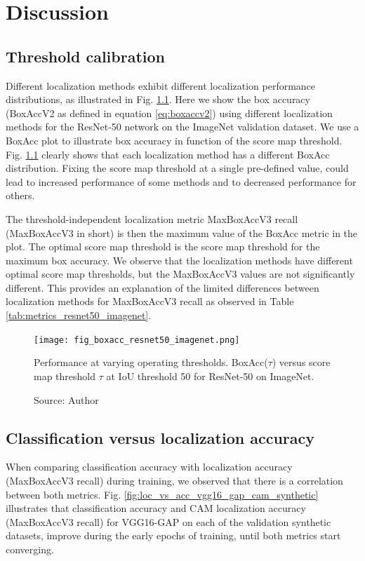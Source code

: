 \chapter{Discussion} \label{ch:discussion}

\section{Threshold calibration}
Different localization methods exhibit different localization performance distributions, as illustrated in Fig. \ref{fig:boxacc_resnet50_imagenet}. Here we show the box accuracy (BoxAccV2 as defined in equation \ref{eq:boxaccv2}) using different localization methods for the ResNet-50 network on the ImageNet validation dataset. We use a BoxAcc plot to illustrate box accuracy in function of the score map threshold. Fig. \ref{fig:boxacc_resnet50_imagenet} clearly shows that each localization method has a different BoxAcc distribution. Fixing the score map threshold at a single pre-defined value, could lead to increased performance of some methods and to decreased performance for others. 

The threshold-independent localization metric MaxBoxAccV3 recall (MaxBoxAccV3 in short) is then the maximum value of the BoxAcc metric in the plot. The optimal score map threshold is the score map threshold for the maximum box accuracy. We observe that the localization methods have different optimal score map thresholds, but the MaxBoxAccV3 values are not significantly different. This provides an explanation of the limited differences between localization methods for MaxBoxAccV3 recall as observed in Table \ref{tab:metrics_resnet50_imagenet}.

\begin{figure}[ht]
    \begin{center}       
    \texttt{[image: fig\_boxacc\_resnet50\_imagenet.png]}
    \caption[BoxAcc (IoU 50)for ResNet-50 on ImageNet]{Performance at varying operating thresholds. BoxAcc($\tau$) versus score map threshold $\tau$ at IoU threshold 50 for ResNet-50 on ImageNet.}
    \caption*{Source: Author}
    \label{fig:boxacc_resnet50_imagenet}
    \end{center}
\end{figure}

\section{Classification versus localization accuracy}
When comparing classification accuracy with localization accuracy (MaxBoxAccV3 recall) during training, we observed that there is a correlation between both metrics. Fig. \ref{fig:loc_vs_acc_vgg16_gap_cam_synthetic} illustrates that classification accuracy and CAM localization accuracy (MaxBoxAccV3 recall) for VGG16-GAP on each of the validation synthetic datasets, improve during the early epochs of training, until both metrics start converging.

